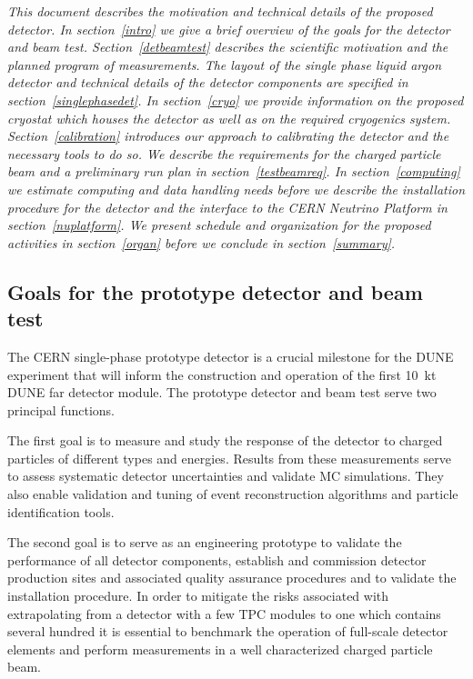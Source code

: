 
{\it 
This document describes the motivation and technical details of the proposed detector. 
In section~\ref{intro} we give a brief overview of the goals for the detector and beam test.
Section~\ref{detbeamtest} describes the scientific motivation and the planned program of measurements. The layout of the single phase liquid argon detector and technical details of the detector components are specified in section~\ref{singlephasedet}. In section~\ref{cryo} we provide information on the proposed cryostat which houses the detector as well as on the required cryogenics system. Section~\ref{calibration} introduces our approach to calibrating the detector and the necessary tools to do so. We describe the requirements for the charged particle beam and a preliminary run plan in section~\ref{testbeamreq}.
In section~\ref{computing} we estimate computing and data handling needs before we describe the installation procedure for the detector
and the interface to the CERN Neutrino Platform in section~\ref{nuplatform}. We present schedule and organization for the proposed activities in section~\ref{organ} before we conclude in section~\ref{summary}.}

\label{intro}


\subsection{Goals for the prototype detector and beam test}

The CERN single-phase prototype detector is a crucial milestone for the DUNE experiment that will inform the construction and operation of the first 10~kt DUNE far detector module.  The prototype detector and beam test serve two principal functions. 

The first goal is 
to measure and study the response of the detector to charged particles of different types and energies. 
Results from these measurements serve to assess systematic detector uncertainties and
validate MC simulations. They also enable validation and tuning of event reconstruction algorithms and particle identification tools.

The second goal is 
to serve as an engineering prototype to validate the performance of all detector components,
establish and commission detector production sites and associated quality assurance procedures and to validate the installation procedure. 
%
In order to mitigate the risks associated with extrapolating 
from a detector with a few TPC modules to one which contains several hundred 
 it is essential to benchmark the operation of full-scale detector elements
and perform measurements in a well characterized charged particle beam.  

